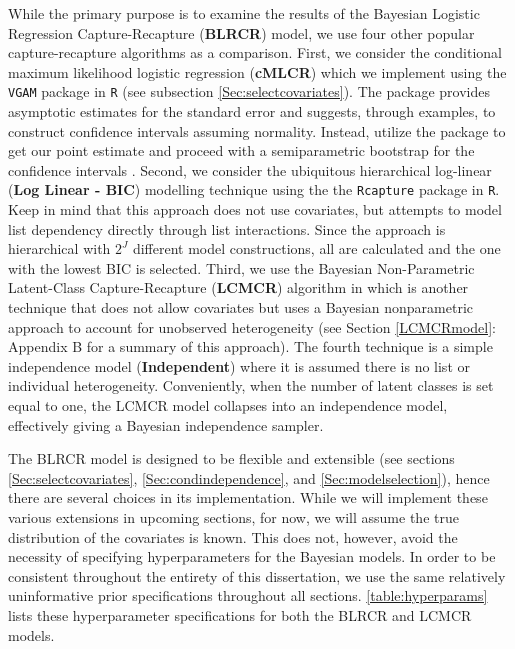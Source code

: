 \documentclass[
  12pt,
]{article}
\begin{document}
While the primary purpose is to examine the results of the Bayesian
Logistic Regression Capture-Recapture (\textbf{BLRCR}) model, we use
four other popular capture-recapture algorithms as a comparison. First,
we consider the conditional maximum likelihood logistic regression
(\textbf{cMLCR}) which we implement using the \texttt{VGAM} package in
\texttt{R} (see subsection \ref{Sec:selectcovariates}). The package
provides asymptotic estimates for the standard error and suggests,
through examples, to construct confidence intervals assuming normality.
Instead, utilize the package to get our point estimate and proceed with
a semiparametric bootstrap for the confidence intervals
\citep{zwane_implementing_2003}. Second, we consider the ubiquitous
hierarchical log-linear (\textbf{Log Linear - BIC}) modelling technique
\citep{fienberg_multiple_1972} using the the \texttt{Rcapture} package
in \texttt{R}. Keep in mind that this approach does not use covariates,
but attempts to model list dependency directly through list
interactions. Since the approach is hierarchical with \(2^J\) different
model constructions, all are calculated and the one with the lowest BIC
is selected. Third, we use the Bayesian Non-Parametric Latent-Class
Capture-Recapture (\textbf{LCMCR}) algorithm in
\cite{manriquevallier_bayesian_2016} which is another technique that
does not allow covariates but uses a Bayesian nonparametric approach to
account for unobserved heterogeneity (see Section \ref{LCMCRmodel}:
Appendix B for a summary of this approach). The fourth technique is a
simple independence model (\textbf{Independent}) where it is assumed
there is no list or individual heterogeneity. Conveniently, when the
number of latent classes is set equal to one, the LCMCR model collapses
into an independence model, effectively giving a Bayesian independence
sampler.

The BLRCR model is designed to be flexible and extensible (see sections
\ref{Sec:selectcovariates}, \ref{Sec:condindependence}, and
\ref{Sec:modelselection}), hence there are several choices in its
implementation. While we will implement these various extensions in
upcoming sections, for now, we will assume the true distribution of the
covariates is known. This does not, however, avoid the necessity of
specifying hyperparameters for the Bayesian models. In order to be
consistent throughout the entirety of this dissertation, we use the same
relatively uninformative prior specifications throughout all sections.
\autoref{table:hyperparams} lists these hyperparameter specifications
for both the BLRCR and LCMCR models.
\end{document}
